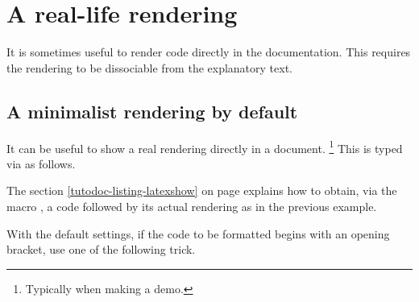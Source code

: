 \documentclass{tutodoc}
\begin{document}
\section{A real-life rendering}
\label{tutodoc-showcase}

It is sometimes useful to render code directly in the documentation. This requires the rendering to be dissociable from the explanatory text.



\subsection{A minimalist rendering by default}

\begin{tdocexa}
    It can be useful to show a real rendering directly in a document.
    \footnote{
        Typically when making a demo.
    }
    This is typed via  as follows.

\end{tdocexa}


\begin{tdocrem}
    The section \ref{tutodoc-listing-latexshow} on page \pageref{tutodoc-listing-latexshow} explains how to obtain, via the macro , a code followed by its actual rendering as in the previous example.
\end{tdocrem}


\begin{tdocwarn}
    With the default settings, if the code to be formatted begins with an opening bracket, use one of the following trick.

    \tdoclatexshow[explain = {This will produce the following.}]%
    		      {examples/showcase/hook.tex}
\end{tdocwarn}
\end{document}
